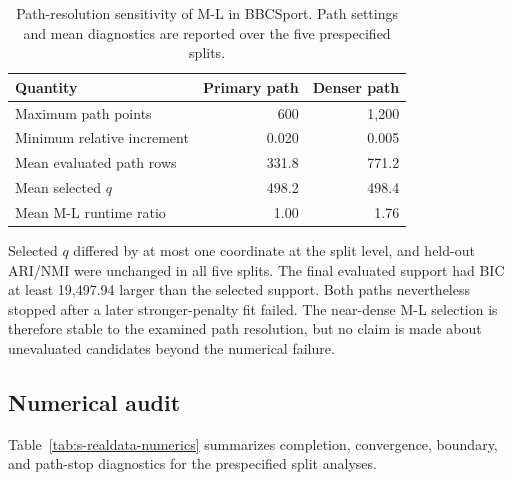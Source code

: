\documentclass[preprint,12pt,authoryear]{elsarticle}
\begin{document}
\begin{table}[H]
\centering
\small
\caption{Path-resolution sensitivity of M-L in BBCSport. Path settings and
mean diagnostics are reported over the five prespecified splits.}
\label{tab:s-bbcsport-ml-path}
\begin{tabular}{lrr}
\toprule
Quantity & Primary path & Denser path \\
\midrule
Maximum path points & 600 & 1,200 \\
Minimum relative increment & 0.020 & 0.005 \\
Mean evaluated path rows & 331.8 & 771.2 \\
Mean selected $q$ & 498.2 & 498.4 \\
Mean M-L runtime ratio & 1.00 & 1.76 \\
\bottomrule
\end{tabular}
\end{table}

Selected $q$ differed by at most one coordinate at the split level, and
held-out ARI/NMI were unchanged in all five splits. The final evaluated
support had BIC at least 19,497.94 larger than the selected support. Both
paths nevertheless stopped after a later stronger-penalty fit failed. The
near-dense M-L selection is therefore stable to the examined path resolution,
but no claim is made about unevaluated candidates beyond the numerical
failure.

\subsection{Numerical audit}

Table~\ref{tab:s-realdata-numerics} summarizes completion, convergence,
boundary, and path-stop diagnostics for the prespecified split analyses.

\begin{table}[H]
\centering
\small
\caption{Convergence and boundary diagnostics for the methods included in the
final prespecified split-performance tables.}
\label{tab:s-realdata-numerics}
\end{table}
\end{document}
